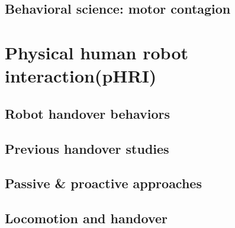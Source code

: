 %


\subsection{Behavioral science: motor contagion}


\clearpage
\section{Physical human robot interaction(pHRI)}

\subsection{Robot handover behaviors}
%

\subsection{Previous handover studies}


\subsection{Passive \& proactive approaches}


\subsection{Locomotion and handover}


\clearpage